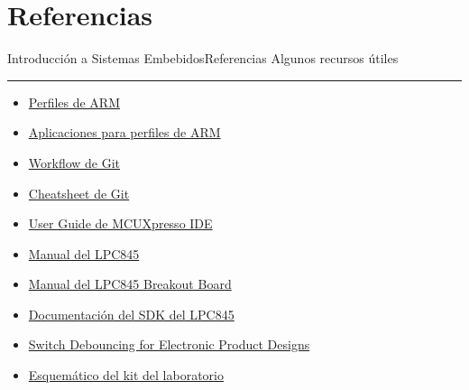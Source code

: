 \documentclass[aspectratio=169, xcolor=dvipsnames]{beamer}
\begin{document}
\section{Referencias}
\begin{frame}{Introducción a Sistemas Embebidos}{Referencias}
    Algunos recursos útiles
    \noindent\rule{\textwidth}{0.75pt}
    \begin{multicols}{2}
    \begin{itemize}
        \item \href{https://sirinsoftware.com/blog/the-arm-processor-a-r-and-m-categories-and-their-specifics}{Perfiles de ARM}
        \item \href{https://www.silabs.com/documents/public/white-papers/Which-ARM-Cortex-Core-Is-Right-for-Your-Application.pdf}{Aplicaciones para perfiles de ARM}
        \item \href{https://medium.com/@praveenmuth2/learn-how-git-works-internally-with-simple-diagrams-a9349dc32831}{Workflow de Git}
        \item \href{https://education.github.com/git-cheat-sheet-education.pdf}{Cheatsheet de Git}
        \item \href{https://community.nxp.com/pwmxy87654/attachments/pwmxy87654/mcuxpresso-ide/9289/1/MCUXpresso_IDE_User_Guide.pdf}{User Guide de MCUXpresso IDE}
        \item \href{https://github.com/utn-fra-lse/lpc845/blob/main/docs/UM11029.pdf}{Manual del LPC845}
        \item \href{https://github.com/utn-fra-lse/lpc845/blob/main/docs/UM11181.pdf}{Manual del LPC845 Breakout Board}
        \item \href{https://mcuxpresso.nxp.com/api_doc/dev/116/modules.html}{Documentación del SDK del LPC845}
        \item \href{https://www.nuvation.com/resources/article/switch-debouncing-electronic-product-designs}{Switch Debouncing for Electronic Product Designs}
        \item \href{https://github.com/utn-fra-lse/lpc845/blob/main/docs/BASE_KIT_V0.pdf}{Esquemático del kit del laboratorio}
    \end{itemize}
    \end{multicols}
\end{frame}
\end{document}
